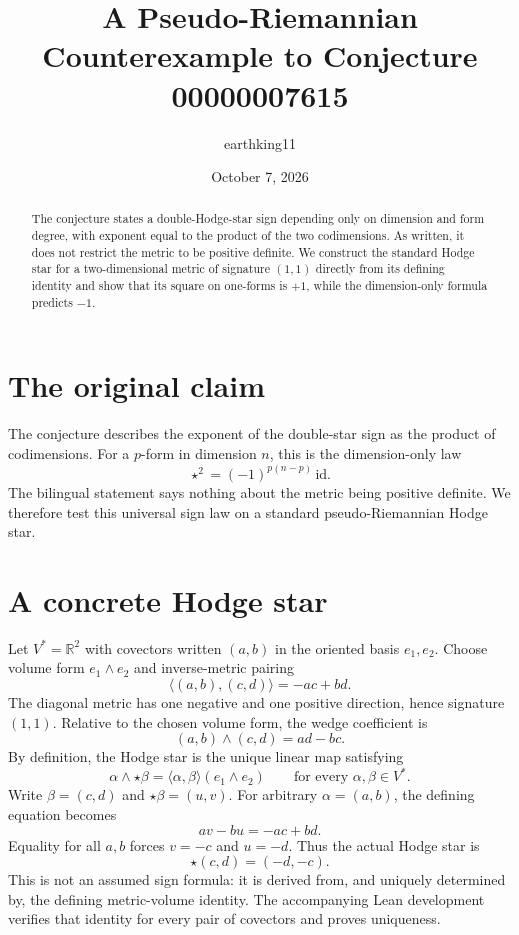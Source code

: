 \documentclass[11pt]{article}
\title{A Pseudo-Riemannian Counterexample to Conjecture 00000007615}
\author{earthking11}
\date{October 7, 2026}
\begin{document}
\maketitle

\begin{abstract}
The conjecture states a double-Hodge-star sign depending only on dimension and form degree, with exponent equal to the product of the two codimensions. As written, it does not restrict the metric to be positive definite. We construct the standard Hodge star for a two-dimensional metric of signature $(1,1)$ directly from its defining identity and show that its square on one-forms is $+1$, while the dimension-only formula predicts $-1$.
\end{abstract}

\section*{The original claim}

The conjecture describes the exponent of the double-star sign as the product of codimensions. For a $p$-form in dimension $n$, this is the dimension-only law
\[
  \star^2 = (-1)^{p(n-p)}\,\mathrm{id}.
\]
The bilingual statement says nothing about the metric being positive definite. We therefore test this universal sign law on a standard pseudo-Riemannian Hodge star.

\section*{A concrete Hodge star}

Let $V^*=\mathbb R^2$ with covectors written $(a,b)$ in the oriented basis $e_1,e_2$. Choose volume form $e_1\wedge e_2$ and inverse-metric pairing
\[
  \langle (a,b),(c,d)\rangle = -ac+bd.
\]
The diagonal metric has one negative and one positive direction, hence signature $(1,1)$. Relative to the chosen volume form, the wedge coefficient is
\[
  (a,b)\wedge(c,d) = ad-bc.
\]
By definition, the Hodge star is the unique linear map satisfying
\[
  \alpha\wedge\star\beta = \langle\alpha,\beta\rangle(e_1\wedge e_2)
  \qquad\text{for every }\alpha,\beta\in V^*.
\]
Write $\beta=(c,d)$ and $\star\beta=(u,v)$. For arbitrary $\alpha=(a,b)$, the defining equation becomes
\[
  av-bu=-ac+bd.
\]
Equality for all $a,b$ forces $v=-c$ and $u=-d$. Thus the actual Hodge star is
\[
  \star(c,d)=(-d,-c).
\]
This is not an assumed sign formula: it is derived from, and uniquely determined by, the defining metric-volume identity. The accompanying Lean development verifies that identity for every pair of covectors and proves uniqueness.
\end{document}
